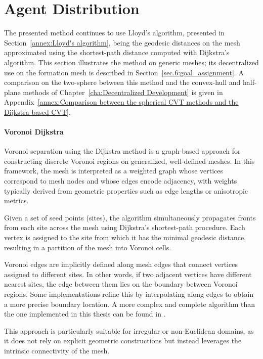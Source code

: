 \section{Agent Distribution} \label{sec.6:Iterative computation agent spacing on the two-sphere}

The presented method continues to use Lloyd's algorithm, presented in Section~\ref{annex:Lloyd's algorithm}, being the geodesic distances on the mesh approximated using the shortest-path distance computed with Dijkstra's algorithm. This section illustrates the method on generic meshes; its decentralized use on the formation mesh is described in Section~\ref{sec.6:goal_assignment}. A comparison on the two-sphere between this method and the convex-hull and half-plane methods of Chapter~\ref{cha:Decentralized Development} is given in Appendix~\ref{annex:Comparison between the spherical CVT methods and the Dijkstra-based CVT}.

\paragraph{Voronoi Dijkstra}
Voronoi separation using the Dijkstra method is a graph-based approach for constructing discrete Voronoi regions on generalized, well-defined meshes. In this framework, the mesh is interpreted as a weighted graph whose vertices correspond to mesh nodes and whose edges encode adjacency, with weights typically derived from geometric properties such as edge lengths or anisotropic metrics.

Given a set of seed points (sites), the algorithm simultaneously propagates fronts from each site across the mesh using Dijkstra's shortest-path procedure. Each vertex is assigned to the site from which it has the minimal geodesic distance, resulting in a partition of the mesh into Voronoi cells.

Voronoi edges are implicitly defined along mesh edges that connect vertices assigned to different sites. In other words, if two adjacent vertices have different nearest sites, the edge between them lies on the boundary between Voronoi regions. Some implementations refine this by interpolating along edges to obtain a more precise boundary location. A more complex and complete algorithm than the one implemented in this thesis can be found in \cite{mengEfficientAlgorithmApproximate2023}.

This approach is particularly suitable for irregular or non-Euclidean domains, as it does not rely on explicit geometric constructions but instead leverages the intrinsic connectivity of the mesh.

